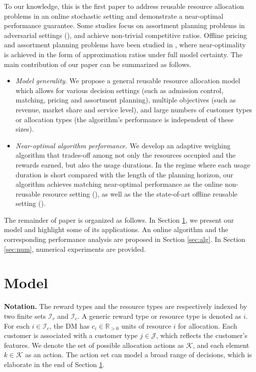 \documentclass[letterpaper, 10 pt, conference]{ieeeconf}  %
\newcommand{\III}{\mathcal{I}}
\newcommand{\JJJ}{\mathcal{J}}
\newcommand{\KKK}{\mathcal{K}}
\theoremstyle{plain}
\theoremstyle{definition}
\theoremstyle{remark}
\begin{document}
To our knowledge, this is the first paper to address reusable resource allocation problems in an online stochastic setting and demonstrate a near-optimal performance guarantee. Some studies focus on assortment planning problems in adversarial settings (\cite{feng2022near, gong2019online, goyal2020asymptotically}), and achieve non-trivial competitive ratios. Offline pricing and assortment planning problems have been studied in \cite{lei2020real,rusmevichientong2020dynamic,feng2022near}, where near-optimality is achieved in the form of approximation ratios under full model certainty. The main contribution of our paper can be summarized as follows. 
\begin{itemize}
\item \emph{Model generality.} We propose a general reusable resource allocation model which allows for various decision settings (such as admission control, matching, pricing and assortment planning), multiple objectives (such as revenue, market share and service level), and large numbers of customer types or allocation types (the algorithm's performance is independent of these sizes).
\item \emph{Near-optimal algorithm performance.} We develop an adaptive weighing algorithm that trades-off among not only the resources occupied and the rewards earned, but also the usage durations. In the regime where each usage duration is short compared with the length of the planning horizon, our algorithm achieves matching near-optimal performance as the online non-reusable resource setting (\cite{devanur2019near}), as well as the the state-of-art offline reusable setting (\cite{feng2022near}).
\end{itemize}
The remainder of paper is organized as follows. In Section \ref{sec:model}, we present our model and highlight some of its applications. An online algorithm and the corresponding performance analysis are proposed in Section \ref{sec:alg}. In Section \ref{sec:num}, numerical experiments are provided.

\section{Model}\label{sec:model}
\textbf{Notation. }The reward types and the resource types are respectively indexed by two finite sets $\III_r$ and $\III_c$. A generic reward type or resource type is denoted as $i$. For each $i\in \III_c$, the DM has $c_i\in \mathbb{R}_{>0}$ units of resource $i$ for allocation. Each customer is associated with a customer type $j\in \JJJ$, which reflects the customer's features.  
We denote the set of possible allocation actions as $\KKK$, and each element $k\in \KKK$ as an action. The action set can model a broad range of decisions, which is elaborate in the end of Section \ref{sec:model}. 
\end{document}
